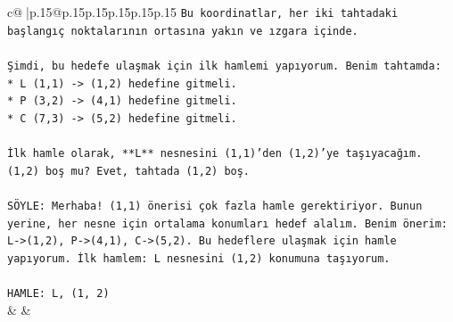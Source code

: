 \documentclass{article}
\begin{document}
{\begin{supertabular}{c@{$\;$}|p{.15\linewidth}@{}p{.15\linewidth}p{.15\linewidth}p{.15\linewidth}p{.15\linewidth}p{.15\linewidth}}
{{{\texttt{Bu koordinatlar, her iki tahtadaki başlangıç noktalarının ortasına yakın ve ızgara içinde.} \\
\\ 
\texttt{Şimdi, bu hedefe ulaşmak için ilk hamlemi yapıyorum. Benim tahtamda:} \\
\texttt{*   L (1,1) {-}> (1,2) hedefine gitmeli.} \\
\texttt{*   P (3,2) {-}> (4,1) hedefine gitmeli.} \\
\texttt{*   C (7,3) {-}> (5,2) hedefine gitmeli.} \\
\\ 
\texttt{İlk hamle olarak, **L** nesnesini (1,1)'den (1,2)'ye taşıyacağım. (1,2) boş mu? Evet, tahtada (1,2) boş.} \\
\\ 
\texttt{SÖYLE: Merhaba! (1,1) önerisi çok fazla hamle gerektiriyor. Bunun yerine, her nesne için ortalama konumları hedef alalım. Benim önerim: L{-}>(1,2), P{-}>(4,1), C{-}>(5,2). Bu hedeflere ulaşmak için hamle yapıyorum. İlk hamlem: L nesnesini (1,2) konumuna taşıyorum.} \\
\\ 
\texttt{HAMLE: L, (1, 2)} \\
            }
        }
    }
    & & \\ \\


\end{supertabular}}
\end{document}
